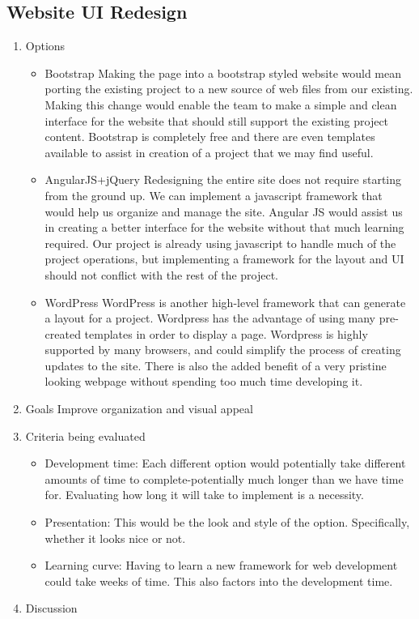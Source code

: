 \documentclass[letterpaper, 10pt, draftclsnofoot, compsoc, onecolumn]{IEEEtran}
\begin{document}
	\subsection{Website UI Redesign}
		\begin{enumerate}
			\item{Options}
				\begin{itemize}
					\item{Bootstrap}
					Making the page into a bootstrap styled website would mean porting the existing project to a new source of web files from our existing. Making this change would enable the team to make a simple and clean interface for the website that should still support the existing project content. Bootstrap is completely free and there are even templates available to assist in creation of a project that we may find useful.
					\item{AngularJS+jQuery}
					Redesigning the entire site does not require starting from the ground up. We can implement a javascript framework that would help us organize and manage the site. Angular JS would assist us in creating a better interface for the website without that much learning required. Our project is already using javascript to handle much of the project operations, but implementing a framework for the layout and UI should not conflict with the rest of the project.
					\item{WordPress}
					WordPress is another high-level framework that can generate a layout for a project. Wordpress has the advantage of using many pre-created templates in order to display a page. Wordpress is highly supported by many browsers, and could simplify the process of creating updates to the site. There is also the added benefit of a very pristine looking webpage without spending too much time developing it.
				\end{itemize}
			\item{Goals}
			Improve organization and visual appeal
			\item{Criteria being evaluated}
				\begin{itemize}
					\item{Development time:  Each different option would potentially take different amounts of time to complete-potentially much longer than we have time for. Evaluating how long it will take to implement is a necessity.}
					\item{Presentation: This would be the look and style of the option. Specifically, whether it looks nice or not.}
					\item{Learning curve: Having to learn a new framework for web development could take weeks of time. This also factors into the development time.}
				\end{itemize}
			\item{Discussion}
			

\end{enumerate}
\end{document}
